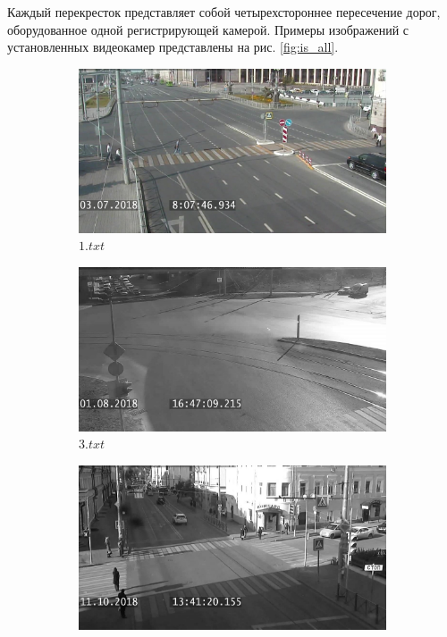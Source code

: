 Каждый перекресток представляет собой четырехстороннее пересечение дорог, оборудованное одной регистрирующей камерой. Примеры изображений с установленных видеокамер представлены на рис. \ref{fig:is_all}.

\begin{figure}[!htb]
	\centering
	\begin{subfigure}[!htb]{0.48\textwidth}
		\centering{}
		\includegraphics[width=\textwidth]{images/is-1.jpg}
		\caption{$1.txt$}
		\label{fig:is_1}
	\end{subfigure}
	\hfill
	\begin{subfigure}[!htb]{0.48\textwidth}
		\centering{}
		\includegraphics[width=\textwidth]{images/is-2.jpg}
		\caption{$3.txt$}
		\label{fig:is_2}
	\end{subfigure}
	\hfill
	\begin{subfigure}[!htb]{0.48\textwidth}
		\centering{}
		\includegraphics[width=\textwidth]{images/is-3.jpg}

\end{subfigure}
\end{figure}
